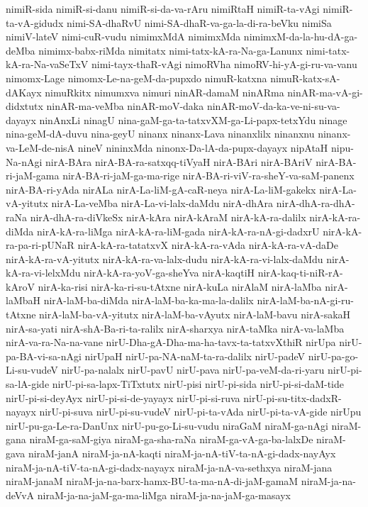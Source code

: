 {nimiR-sida
nimiR-si-danu
nimiR-si-da-va-rAru
nimiRtaH
nimiR-ta-vAgi
nimiR-ta-vA-gidudx
nimi-SA-dhaRvU
nimi-SA-dhaR-va-ga-la-di-ra-beVku
nimiSa
nimiV-lateV
nimi-cuR-vudu
nimimxMdA
nimimxMda
nimimxM-da-la-hu-dA-ga-deMba
nimimx-babx-riMda
nimitatx
nimi-tatx-kA-ra-Na-ga-Lanunx
nimi-tatx-kA-ra-Na-vaSeTxV
nimi-tayx-thaR-vAgi
nimoRVha
nimoRV-hi-yA-gi-ru-va-vanu
nimomx-Lage
nimomx-Le-na-geM-da-pupxdo
nimuR-katxna
nimuR-katx-sA-dAKayx
nimuRkitx
nimumxva
nimuri
ninAR-damaM
ninARma
ninAR-ma-vA-gi-didxtutx
ninAR-ma-veMba
ninAR-moV-daka
ninAR-moV-da-ka-ve-ni-su-va-dayayx
ninAnxLi
ninagU
nina-gaM-ga-ta-tatxvXM-ga-Li-papx-tetxYdu
ninage
nina-geM-dA-duvu
nina-geyU
ninanx
ninanx-Lava
ninanxlilx
ninanxnu
ninanx-va-LeM-de-nisA
nineV
nininxMda
ninonx-Da-lA-da-pupx-dayayx
nipAtaH
nipu-Na-nAgi
nirA-BAra
nirA-BA-ra-satxqq-tiVyaH
nirA-BAri
nirA-BAriV
nirA-BA-ri-jaM-gama
nirA-BA-ri-jaM-ga-ma-rige
nirA-BA-ri-viV-ra-sheY-va-saM-panenx
nirA-BA-ri-yAda
nirALa
nirA-La-liM-gA-caR-neya
nirA-La-liM-gakekx
nirA-La-vA-yitutx
nirA-La-veMba
nirA-La-vi-lalx-daMdu
nirA-dhAra
nirA-dhA-ra-dhA-raNa
nirA-dhA-ra-diVkeSx
nirA-kAra
nirA-kAraM
nirA-kA-ra-dalilx
nirA-kA-ra-diMda
nirA-kA-ra-liMga
nirA-kA-ra-liM-gada
nirA-kA-ra-nA-gi-dadxrU
nirA-kA-ra-pa-ri-pUNaR
nirA-kA-ra-tatatxvX
nirA-kA-ra-vAda
nirA-kA-ra-vA-daDe
nirA-kA-ra-vA-yitutx
nirA-kA-ra-va-lalx-dudu
nirA-kA-ra-vi-lalx-daMdu
nirA-kA-ra-vi-lelxMdu
nirA-kA-ra-yoV-ga-sheYva
nirA-kaqtiH
nirA-kaq-ti-niR-rA-kAroV
nirA-ka-risi
nirA-ka-ri-su-tAtxne
nirA-kuLa
nirAlaM
nirA-laMba
nirA-laMbaH
nirA-laM-ba-diMda
nirA-laM-ba-ka-ma-la-dalilx
nirA-laM-ba-nA-gi-ru-tAtxne
nirA-laM-ba-vA-yitutx
nirA-laM-ba-vAyutx
nirA-laM-bavu
nirA-sakaH
nirA-sa-yati
nirA-shA-Ba-ri-ta-ralilx
nirA-sharxya
nirA-taMka
nirA-va-laMba
nirA-va-ra-Na-na-vane
nirU-Dha-gA-Dha-ma-ha-tavx-ta-tatxvXthiR
nirUpa
nirU-pa-BA-vi-sa-nAgi
nirUpaH
nirU-pa-NA-naM-ta-ra-dalilx
nirU-padeV
nirU-pa-go-Li-su-vudeV
nirU-pa-nalalx
nirU-pavU
nirU-pava
nirU-pa-veM-da-ri-yaru
nirU-pi-sa-lA-gide
nirU-pi-sa-lapx-TiTxtutx
nirU-pisi
nirU-pi-sida
nirU-pi-si-daM-tide
nirU-pi-si-deyAyx
nirU-pi-si-de-yayayx
nirU-pi-si-ruva
nirU-pi-su-titx-dadxR-nayayx
nirU-pi-suva
nirU-pi-su-vudeV
nirU-pi-ta-vAda
nirU-pi-ta-vA-gide
nirUpu
nirU-pu-ga-Le-ra-DanUnx
nirU-pu-go-Li-su-vudu
niraGaM
niraM-ga-nAgi
niraM-gana
niraM-ga-saM-giya
niraM-ga-sha-raNa
niraM-ga-vA-ga-ba-lalxDe
niraM-gava
niraM-janA
niraM-ja-nA-kaqti
niraM-ja-nA-tiV-ta-nA-gi-dadx-nayAyx
niraM-ja-nA-tiV-ta-nA-gi-dadx-nayayx
niraM-ja-nA-va-sethxya
niraM-jana
niraM-janaM
niraM-ja-na-barx-hamx-BU-ta-ma-nA-di-jaM-gamaM
niraM-ja-na-deVvA
niraM-ja-na-jaM-ga-ma-liMga
niraM-ja-na-jaM-ga-masayx
}
